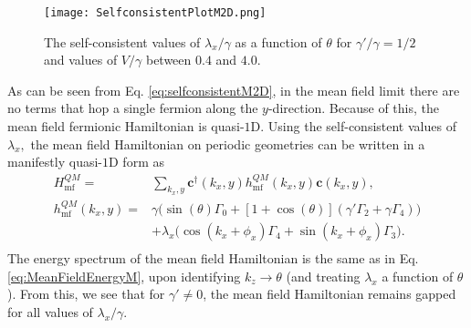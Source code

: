 \documentclass[prb,aps,twocolumn,groupaddress,floatfix]{revtex4-1}
\begin{document}
\begin{figure}\centering
\texttt{[image: SelfconsistentPlotM2D.png]}
\caption{The self-consistent values of $\lambda_x/\gamma$ as a function of $\theta$ for $\gamma'/\gamma = 1/2$ and values of $V/\gamma$ between $0.4$ and $4.0.$}\label{fig:consistentplot2DM}
\end{figure}


As can be seen from Eq. \ref{eq:selfconsistentM2D}, in the mean field limit there are no terms that hop a single fermion along the $y$-direction. Because of this, the mean field fermionic Hamiltonian is quasi-$1$D. Using the self-consistent values of $\lambda_x,$ the mean field Hamiltonian on periodic geometries can be written in a manifestly quasi-$1$D form as
\begin{equation}
\begin{split}
H^{QM}_{\text{mf}} =& \sum_{k_x,y} \bm{c}^\dagger(k_x,y) h^{QM}_{\text{mf}}(k_x,y) \bm{c}(k_x,y),  \\
h^{QM}_{\text{mf}}(k_x,y) =&\gamma \big(\sin(\theta )\Gamma_0 +[1+\cos(\theta )](\gamma'\Gamma_2+\gamma \Gamma_4) \big)\\
&+ \lambda_x \big(\cos(k_x+\phi_{x})\Gamma_4 + \sin(k_x + \phi_{x}) \Gamma_3\big).\\
\end{split}\label{eq:LatticeHSFourier2DM}
\end{equation}
The energy spectrum of the mean field Hamiltonian is the same as in Eq. \ref{eq:MeanFieldEnergyM}, upon identifying $k_z \rightarrow \theta$ (and treating $\lambda_x$ a function of $\theta$). From this, we see that for $\gamma' \neq 0$, the mean field Hamiltonian remains gapped for all values of $\lambda_x/\gamma$. 
\end{document}
